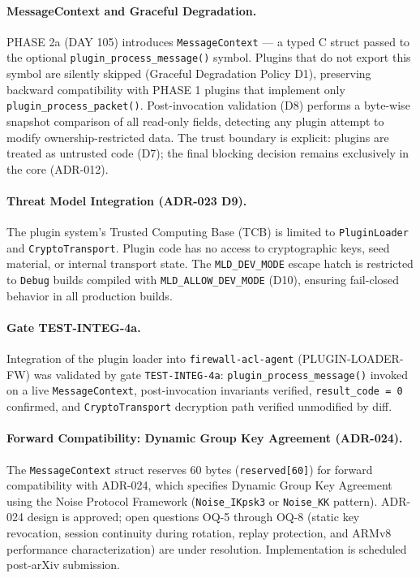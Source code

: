 \documentclass[11pt,a4paper]{article}
\begin{document}
    \paragraph{MessageContext and Graceful Degradation.}
    PHASE 2a (DAY 105) introduces \texttt{MessageContext} --- a typed C struct passed to the
    optional \texttt{plugin\_process\_message()} symbol. Plugins that do not export this symbol
    are silently skipped (Graceful Degradation Policy D1), preserving backward compatibility with
    PHASE 1 plugins that implement only \texttt{plugin\_process\_packet()}. Post-invocation
    validation (D8) performs a byte-wise snapshot comparison of all read-only fields, detecting
    any plugin attempt to modify ownership-restricted data. The trust boundary is explicit: plugins
    are treated as untrusted code (D7); the final blocking decision remains exclusively in the
    core (ADR-012).

    \paragraph{Threat Model Integration (ADR-023 D9).}
    The plugin system's Trusted Computing Base (TCB) is limited to \texttt{PluginLoader} and
    \texttt{CryptoTransport}. Plugin code has no access to cryptographic keys, seed material,
    or internal transport state. The \texttt{MLD\_DEV\_MODE} escape hatch is restricted to
    \texttt{Debug} builds compiled with \texttt{MLD\_ALLOW\_DEV\_MODE} (D10), ensuring
    fail-closed behavior in all production builds.

    \paragraph{Gate TEST-INTEG-4a.}
    Integration of the plugin loader into \texttt{firewall-acl-agent} (PLUGIN-LOADER-FW) was
    validated by gate \texttt{TEST-INTEG-4a}: \texttt{plugin\_process\_message()} invoked on a
    live \texttt{MessageContext}, post-invocation invariants verified, \texttt{result\_code = 0}
    confirmed, and \texttt{CryptoTransport} decryption path verified unmodified by diff.

    \paragraph{Forward Compatibility: Dynamic Group Key Agreement (ADR-024).}
    The \texttt{MessageContext} struct reserves 60 bytes (\texttt{reserved[60]}) for forward
    compatibility with ADR-024, which specifies Dynamic Group Key Agreement using the Noise
    Protocol Framework (\texttt{Noise\_IKpsk3} or \texttt{Noise\_KK} pattern). ADR-024 design
    is approved; open questions OQ-5 through OQ-8 (static key revocation, session continuity
    during rotation, replay protection, and ARMv8 performance characterization) are under
    resolution. Implementation is scheduled post-arXiv submission.
\end{document}
